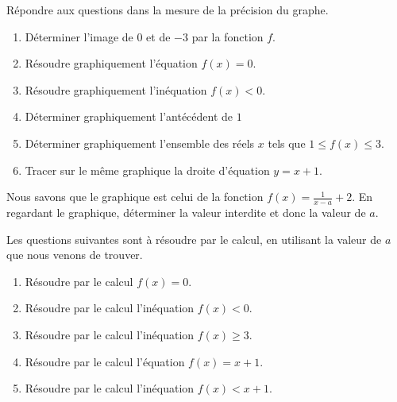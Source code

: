 
\begin{exercice}\label{exosmath-0316}

Répondre aux questions dans la mesure de la précision du graphe.

\begin{center}
   
\end{center}
\begin{enumerate}
    \item
        Déterminer l'image de \( 0\) et de \( -3\) par la fonction \( f\).
    \item
        Résoudre graphiquement l'équation \( f(x)=0\).
    \item
        Résoudre graphiquement l'inéquation \( f(x)<0\).
    \item
        Déterminer graphiquement l'antécédent de \( 1\)
    \item
        Déterminer graphiquement l'ensemble des réels \( x\) tels que \( 1\leq f(x)\leq 3\).
    \item
        Tracer sur le même graphique la droite d'équation \( y=x+1\).
\end{enumerate}

Nous savons que le graphique est celui de la fonction \( f(x)=\frac{1}{ x-a }+2\). En regardant le graphique, déterminer la valeur interdite et donc la valeur de \( a\).

Les questions suivantes sont à résoudre par le calcul, en utilisant la valeur de \( a\) que nous venons de trouver.
\begin{enumerate}
    \item
        Résoudre par le calcul \( f(x)=0\).
    \item
        Résoudre par le calcul l'inéquation \( f(x)<0\).
    \item
        Résoudre par le calcul l'inéquation \( f(x)\geq 3\).
    \item
        Résoudre par le calcul l'équation \( f(x)=x+1\).
    \item
        Résoudre par le calcul l'inéquation \( f(x)<x+1\).
\end{enumerate}

\end{exercice}
